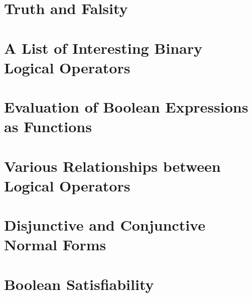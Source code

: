 


\section{Truth and Falsity}


\section{A List of Interesting Binary Logical Operators}


\section{Evaluation of Boolean Expressions as Functions}


\section{Various Relationships between Logical Operators}


\section{Disjunctive and Conjunctive Normal Forms}


\section{Boolean Satisfiability}

